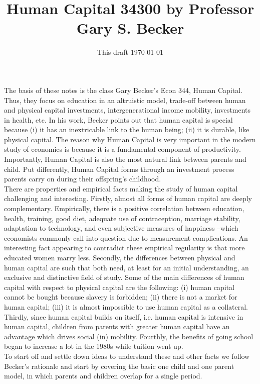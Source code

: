 



\title{Human Capital 34300 by Professor Gary S. Becker}
\author{}
\date{This draft \today}
\maketitle


\noindent The basis of these notes is the class Gary Becker's Econ 344, Human Capital. Thus, they focus on education in an altruistic model, trade-off between human and physical capital investments, intergenerational income mobility, investments in health, etc. In his work, Becker points out that human capital is special because (i) it has an inextricable link to the human being; (ii) it is durable, like physical capital. The reason why Human Capital is very important in the modern study of economics is because it is a fundamental component of productivity. Importantly, Human Capital is also the most natural link between parents and child. Put differently, Human Capital forms through an investment process parents carry on during their offspring's childhood.\\
\indent There are properties and empirical facts making the study of human capital challenging and interesting. Firstly, almost all forms of human capital are deeply complementary. Empirically, there is a positive correlation between education, health, training, good diet, adequate use of contraception,  marriage stability, adaptation to technology, and even subjective measures of happiness --which economists commonly call into question due to measurement complications. An interesting fact appearing to contradict these empirical regularity is that more educated women marry less. Secondly, the differences between physical and human capital are such that both need, at least for an initial understanding, an exclusive and distinctive field of study. Some of the main differences of human capital with respect to physical capital are the following: (i) human capital cannot be bought because slavery is forbidden; (ii) there is not a market for human capital; (iii) it is almost impossible to use human capital as a collateral. Thirdly, since human capital builds on itself, i.e. human capital is intensive in human capital, children from parents with greater human capital have an advantage which drives social (in) mobility. Fourthly, the benefits of going school began to increase a lot in the 1980s while tuition went up.\\  
\indent To start off and settle down ideas to understand these and other facts we follow Becker's rationale and start by covering the basic one child and one parent model, in which parents and children overlap for a single period.

